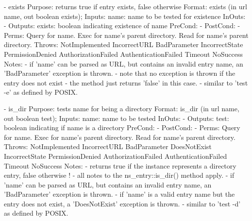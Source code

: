 \begin{myspec}
 
    - exists
      Purpose:  returns true if entry exists, false otherwise
      Format:   exists             (in  url       name,
                                    out boolean  exists);
      Inputs:   name:               name to be tested for
                                    existence
      InOuts:   -
      Outputs:  exists:             boolean indicating existence
                                    of name
      PreCond:  -
      PostCond: -
      Perms:    Query for name.
                Exec  for name's parent directory.
                Read  for name's parent directory.
      Throws:   NotImplemented
                IncorrectURL
                BadParameter
                IncorrectState
                PermissionDenied
                AuthorizationFailed
                AuthenticationFailed
                Timeout
                NoSuccess
      Notes:    - if 'name' can be parsed as URL, but contains 
                  an invalid entry name, an 'BadParameter'
                  exception is thrown.
                - note that no exception is thrown if the entry
                  does not exist - the method just returns
                  'false' in this case.
                - similar to 'test -e' as defined by POSIX.
 
 
    - is_dir
      Purpose:  tests name for being a directory
      Format:   is_dir             (in  url       name,
                                    out boolean test);
      Inputs:   name:               name to be tested
      InOuts:   -
      Outputs:  test:               boolean indicating if name
                                    is a directory
      PreCond:  -
      PostCond: -
      Perms:    Query for name.
                Exec  for name's parent directory.
                Read  for name's parent directory.
      Throws:   NotImplemented
                IncorrectURL
                BadParameter
                DoesNotExist
                IncorrectState
                PermissionDenied
                AuthorizationFailed
                AuthenticationFailed
                Timeout
                NoSuccess
      Notes:    - returns true if the instance represents
                  a directory entry, false otherwise
!               - all notes to the ns_entry::is_dir() method 
                  apply.
                - if 'name' can be parsed as URL, but contains 
                  an invalid entry name, an 'BadParameter'
                  exception is thrown.
                - if 'name' is a valid entry name but the entry
                  does not exist, a 'DoesNotExist' exception is
                  thrown.
                - similar to 'test -d' as defined by POSIX.
 

\end{myspec}
